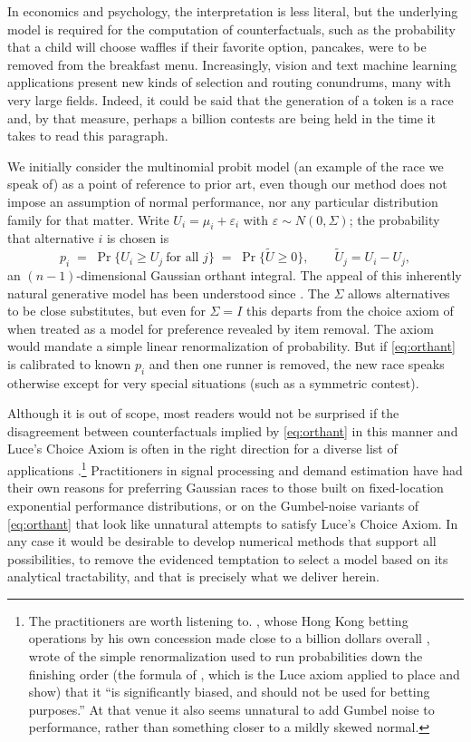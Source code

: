 \documentclass[11pt]{article}
\begin{document}
In economics and psychology, the interpretation is less literal, but the underlying model is required for the computation of counterfactuals, such as the probability that a child will choose waffles if their favorite option, pancakes, were to be removed from the breakfast menu. Increasingly, vision and text machine learning applications present new kinds of selection and routing conundrums, many with very large fields. Indeed, it could be said that the generation of a token is a race and, by that measure, perhaps a billion contests are being held in the time it takes to read this paragraph.

We initially consider the multinomial probit model (an example of the race we speak of) as a point of reference to prior art, even though our method does not impose an assumption of normal performance, nor any particular distribution family for that matter. Write $U_i = \mu_i + \varepsilon_i$ with
$\varepsilon\sim N(0,\Sigma)$; the probability that alternative $i$ is chosen is
\begin{equation}\label{eq:orthant}
p_i \;=\; \Pr\{U_i \ge U_j \ \text{for all } j\}
      \;=\; \Pr\{\tilde U \ge 0\},
\qquad \tilde U_j = U_i - U_j,
\end{equation}
an $(n-1)$-dimensional Gaussian orthant integral. The appeal of this inherently natural generative model has been understood since \citet{thurstone1927}. The $\Sigma$ allows alternatives to be close substitutes, but even for $\Sigma=I$ this departs from the choice axiom of \citet{luce1959} when treated as a model for preference revealed by item removal. The axiom would mandate a simple linear renormalization of probability. But if \eqref{eq:orthant} is calibrated to known $p_i$ and then one runner is removed, the new race speaks otherwise except for very special situations (such as a symmetric contest).

Although it is out of scope, most readers would not be surprised if the disagreement between counterfactuals implied by \eqref{eq:orthant} in this manner and Luce's Choice Axiom is often in the right direction for a diverse list of applications \citep{cottonsurvey}.\footnote{The practitioners are worth listening to. \citet{benter1994},
whose Hong Kong betting operations by his own concession made close to a
billion dollars overall \citep{chellel2018}, wrote of the simple
renormalization used to run probabilities down the finishing order (the
formula of \citet{harville1973}, which is the Luce axiom applied to place
and show)
that it ``is significantly biased, and should not be used for betting
purposes.'' At that venue it also seems unnatural to add Gumbel noise to
performance, rather than something closer to a mildly skewed normal.} Practitioners in signal processing and demand estimation have had their own reasons for preferring Gaussian races to those built on fixed-location exponential performance distributions, or on the Gumbel-noise variants of \eqref{eq:orthant} that look like unnatural attempts to satisfy Luce's Choice Axiom. In any case it would be desirable to develop numerical methods that support all possibilities, to remove the evidenced temptation to select a model based on its analytical tractability, and that is precisely what we deliver herein.
\end{document}
